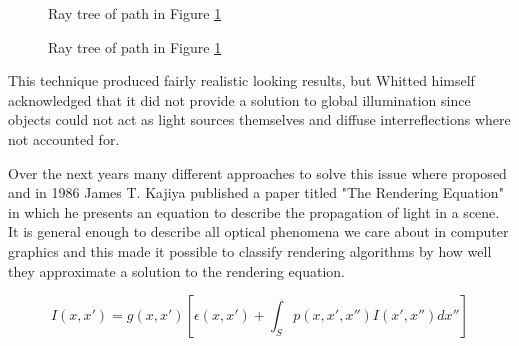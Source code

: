 \documentclass{ACGSeminar}
\begin{document}
\begin{figure}[htb!]
  \begin{centering}
    \par
  \end{centering}
  \caption{Ray tree of path in Figure \ref{fig:ray-path}}
  \label{fig:ray-path}
\end{figure}

\begin{figure}[htb!]
  \begin{center}
  \end{center}
  \caption{Ray tree of path in Figure \ref{fig:ray-path}}
  \label{fig:illum-tree}
\end{figure}
This technique produced fairly realistic looking results, but Whitted himself acknowledged that it did not provide a solution to global illumination since objects could not act as light sources themselves and diffuse interreflections where not accounted for.

Over the next years many different approaches to solve this issue where proposed and in 1986 James T. Kajiya published a paper titled "The Rendering Equation"  \cite{Kajiya:1986} in which he presents an equation to describe the propagation of light in a scene. It is general enough to describe all optical phenomena we care about in computer graphics and this made it possible to classify rendering algorithms by how well they approximate a solution to the rendering equation.

\begin{equation} \label{eq:rendering-equation}
I(x,x')=g(x,x') [\epsilon(x,x') + \int_{S}{p(x,x',x'')I(x',x'')dx''}]
\end{equation}
\end{document}
